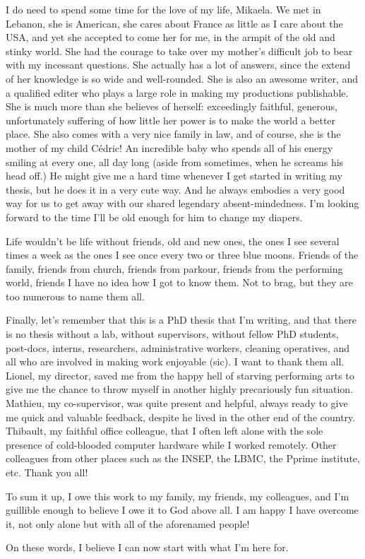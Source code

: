 I do need to spend some time for the love of my life, Mikaela. We met in Lebanon, she is American, she cares about France as little as I care about the USA, and yet she accepted to come her for me, in the armpit of the old and stinky world. She had the courage to take over my mother's difficult job to bear with my incessant questions. She actually has a lot of answers, since the extend of her knowledge is so wide and well-rounded. She is also an awesome writer, and a qualified editer who plays a large role in making my productions publishable. She is much more than she believes of herself: exceedingly faithful, generous, unfortunately suffering of how little her power is to make the world a better place. She also comes with a very nice family in law, and of course, she is the mother of my child Cédric! An incredible baby who spends all of his energy smiling at every one, all day long (aside from sometimes, when he screams his head off.) He might give me a hard time whenever I get started in writing my thesis, but he does it in a very cute way. And he always embodies a very good way for us to get away with our shared legendary absent-mindedness. I'm looking forward to the time I'll be old enough for him to change my diapers.

Life wouldn't be life without friends, old and new ones, the ones I see several times a week as the ones I see once every two or three blue moons. Friends of the family, friends from church, friends from parkour, friends from the performing world, friends I have no idea how I got to know them. Not to brag, but they are too numerous to name them all. 

Finally, let's remember that this is a PhD thesis that I'm writing, and that there is no thesis without a lab, without supervisors, without fellow PhD students, post-docs, interns, researchers, administrative workers, cleaning operatives, and all who are involved in making work enjoyable (sic). I want to thank them all. Lionel, my director, saved me from the happy hell of starving performing arts to give me the chance to throw myself in another highly precariously fun situation. Mathieu, my co-supervisor, was quite present and helpful, always ready to give me quick and valuable feedback, despite he lived in the other end of the country. Thibault, my faithful office colleague, that I often left alone with the sole presence of cold-blooded computer hardware while I worked remotely. Other colleagues from other places such as the INSEP, the LBMC, the Pprime institute, etc. Thank you all!

To sum it up, I owe this work to my family, my friends, my colleagues, and I'm guillible enough to believe I owe it to God above all. I am happy I have overcome it, not only alone but with all of the aforenamed people!

On these words, I believe I can now start with what I'm here for.